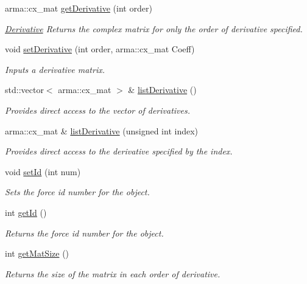 \begin{DoxyCompactItemize}
arma\-::cx\-\_\-mat \hyperlink{classosea_1_1ofreq_1_1mat_force_react_a916eb8547f09eb3bf67092f0f64ac59c}{get\-Derivative} (int order)
\begin{DoxyCompactList}\small\item\em \hyperlink{classosea_1_1ofreq_1_1_derivative}{Derivative} Returns the complex matrix for only the order of derivative specified. \end{DoxyCompactList}\item 
void \hyperlink{classosea_1_1ofreq_1_1mat_force_react_ad887dadbcd1dcd2fdf9c78ac39fcacd4}{set\-Derivative} (int order, arma\-::cx\-\_\-mat Coeff)
\begin{DoxyCompactList}\small\item\em Inputs a derivative matrix. \end{DoxyCompactList}\item 
std\-::vector$<$ arma\-::cx\-\_\-mat $>$ \& \hyperlink{classosea_1_1ofreq_1_1mat_force_react_a52f785374b8e9b6e4d33e0eac95c8622}{list\-Derivative} ()
\begin{DoxyCompactList}\small\item\em Provides direct access to the vector of derivatives. \end{DoxyCompactList}\item 
arma\-::cx\-\_\-mat \& \hyperlink{classosea_1_1ofreq_1_1mat_force_react_af05d5675a035a111264a37472e9ba479}{list\-Derivative} (unsigned int index)
\begin{DoxyCompactList}\small\item\em Provides direct access to the derivative specified by the index. \end{DoxyCompactList}\item 
void \hyperlink{classosea_1_1ofreq_1_1mat_force_react_a778765a5296698179dee923397032756}{set\-Id} (int num)
\begin{DoxyCompactList}\small\item\em Sets the force id number for the object. \end{DoxyCompactList}\item 
int \hyperlink{classosea_1_1ofreq_1_1mat_force_react_ad6416ceeafeb1f1852911fce0536b7f0}{get\-Id} ()
\begin{DoxyCompactList}\small\item\em Returns the force id number for the object. \end{DoxyCompactList}\item 
int \hyperlink{classosea_1_1ofreq_1_1mat_force_react_a9e9d9119e2ca2b49d0faea0897f7e300}{get\-Mat\-Size} ()
\begin{DoxyCompactList}\small\item\em Returns the size of the matrix in each order of derivative. \end{DoxyCompactList}\end{DoxyCompactItemize}

